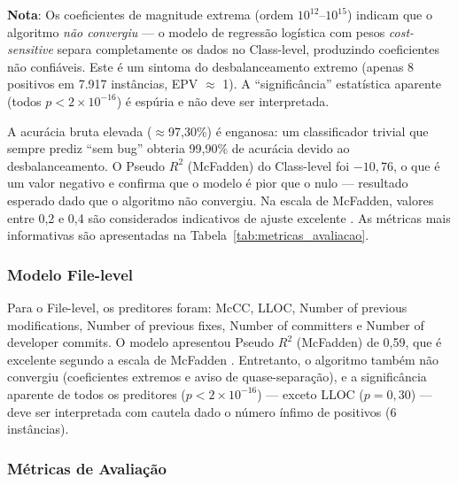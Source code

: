 \documentclass[12pt]{article}
\begin{document}
\textbf{Nota}: Os coeficientes de magnitude extrema (ordem $10^{12}$--$10^{15}$) indicam que o algoritmo \textit{não convergiu} --- o modelo de regressão logística com pesos \textit{cost-sensitive} separa completamente os dados no Class-level, produzindo coeficientes não confiáveis. Este é um sintoma do desbalanceamento extremo (apenas 8 positivos em 7.917 instâncias, EPV $\approx$ 1). A ``significância'' estatística aparente (todos $p < 2 \times 10^{-16}$) é espúria e não deve ser interpretada.

A acurácia bruta elevada ($\approx$97,30\%) é enganosa: um classificador trivial que sempre prediz ``sem bug'' obteria 99,90\% de acurácia devido ao desbalanceamento. O Pseudo $R^2$ (McFadden) do Class-level foi $-10{,}76$, o que é um valor negativo e confirma que o modelo é pior que o nulo --- resultado esperado dado que o algoritmo não convergiu. Na escala de McFadden, valores entre 0,2 e 0,4 são considerados indicativos de ajuste excelente \cite{mcfadden1974}. As métricas mais informativas são apresentadas na Tabela~\ref{tab:metricas_avaliacao}.

\subsubsection{Modelo File-level}

Para o File-level, os preditores foram: McCC, LLOC, Number of previous modifications, Number of previous fixes, Number of committers e Number of developer commits. O modelo apresentou Pseudo $R^2$ (McFadden) de 0,59, que é excelente segundo a escala de McFadden \cite{mcfadden1974}. Entretanto, o algoritmo também não convergiu (coeficientes extremos e aviso de quase-separação), e a significância aparente de todos os preditores ($p < 2 \times 10^{-16}$) --- exceto LLOC ($p = 0{,}30$) --- deve ser interpretada com cautela dado o número ínfimo de positivos (6 instâncias).

\subsubsection{Métricas de Avaliação}
\end{document}
